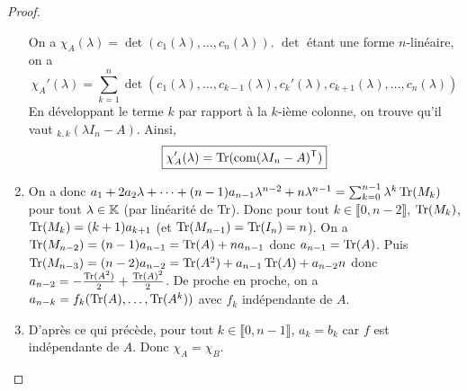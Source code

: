 \documentclass[12pt]{article}
\begin{document}
\begin{proof}
\begin{enumerate}
		On a $\chi_{A}(\lambda)=\det(c_{1}(\lambda),\dots,c_{n}(\lambda))$. $\det$ étant une forme $n$-linéaire, on a 
		\begin{equation}
			\chi_{A}'(\lambda)=\sum_{k=1}^{n}\det(c_{1}(\lambda),\dots,c_{k-1}(\lambda),c_{k}'(\lambda),c_{k+1}(\lambda),\dots,c_{n}(\lambda))
		\end{equation}
		En développant le terme $k$ par rapport à la $k$-ième colonne, on trouve qu'il vaut $_{k,k}(\lambda I_{n}-A)$. Ainsi,
		\begin{equation}
			\boxed{\chi_{A}'(\lambda)=\operatorname{Tr}(\operatorname{com}(\lambda I_{n}-A)^{\mathsf{T}})}
		\end{equation}

		\item On a donc $a_{1}+2a_{2}\lambda+\dots+(n-1)a_{n-1}\lambda^{n-2}+n\lambda^{n-1}=\sum_{k=0}^{n-1}\lambda^{k}\operatorname{Tr}(M_{k})$ pour tout $\lambda\in\mathbb{K}$ (par linéarité de $\operatorname{Tr}$). Donc pour tout $k\in\llbracket0,n-2\rrbracket$, $\operatorname{Tr}(M_{k})$, $\operatorname{Tr}(M_{k})=(k+1)a_{k+1}$ (et $\operatorname{Tr}(M_{n-1})=\operatorname{Tr}(I_{n})=n$). On a $\operatorname{Tr}(M_{n-2})=(n-1)a_{n-1}=\operatorname{Tr}(A)+na_{n-1}$ donc $a_{n-1}=\operatorname{Tr}(A)$. Puis $\operatorname{Tr}(M_{n-3})=(n-2)a_{n-2}=\operatorname{Tr}(A^{2})+a_{n-1}\operatorname{Tr}(A)+a_{n-2}n$ donc $a_{n-2}=-\frac{\operatorname{Tr}(A^{2})}{2}+\frac{\operatorname{Tr}(A)^{2}}{2}$. De proche en proche, on a $a_{n-k}=f_{k}(\operatorname{Tr}(A),\dots,\operatorname{Tr}(A^{k}))$ avec $f_{k}$ indépendante de $A$.
		
		\item D'après ce qui précède, pour tout $k\in\llbracket0,n-1\rrbracket$, $a_{k}=b_{k}$ car $f$ est indépendante de $A$. Donc $\chi_{A}=\chi_{B}$.
	\end{enumerate}
\end{proof}
\end{document}
